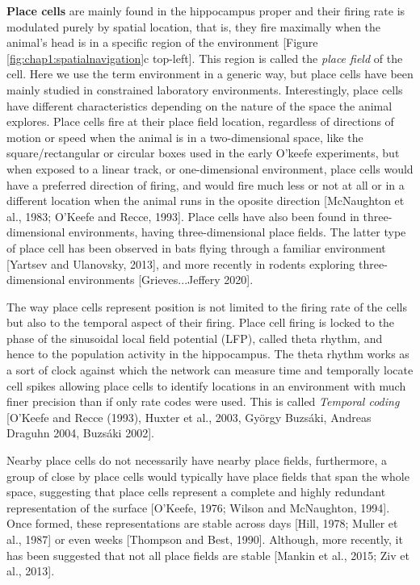 \textbf{Place cells} are mainly found in the hippocampus proper and their firing rate is modulated purely by spatial location, that is, they fire maximally when the animal's head is in a specific region of the environment [Figure \ref{fig:chap1:spatialnavigation}c top-left]. 
This region is called the \textit{place field} of the cell.  
Here we use the term environment in a generic way, but place cells have been mainly studied in constrained laboratory environments.
Interestingly, place cells have different characteristics depending on the nature of the space the animal explores.
Place cells fire at their place field location, regardless of directions of motion or speed when the animal is in a two-dimensional space, like the square/rectangular or circular boxes used in the early O'keefe experiments, but when exposed to a linear track, or one-dimensional environment, place cells would have a preferred direction of firing, and would fire much less or not at all or in a different location when the animal runs in the oposite direction [McNaughton et al., 1983; O’Keefe and Recce, 1993].
Place cells have also been found in three-dimensional environments, having three-dimensional place fields.
The latter type of place cell has been observed in bats flying through a familiar environment [Yartsev and Ulanovsky, 2013], and more recently in rodents exploring three-dimensional environments [Grieves...Jeffery 2020].

The way place cells represent position is not limited to the firing rate of the cells but also to the temporal aspect of their firing. 
Place cell firing is locked to the phase of the sinusoidal local field potential (LFP), called theta rhythm, and hence to the population activity in the hippocampus. 
The theta rhythm works as a sort of clock against which the network can measure time and temporally locate cell spikes allowing place cells to identify locations in an environment with much finer precision than if only rate codes were used.
This is called \textit{Temporal coding} [O’Keefe and Recce (1993), Huxter et al., 2003, György Buzsáki, Andreas Draguhn 2004, Buzsáki 2002].

Nearby place cells do not necessarily have nearby place fields, furthermore, a group of close by place cells would typically have place fields that span the whole space, suggesting that place cells represent a complete and highly redundant representation of the surface [O’Keefe, 1976; Wilson and McNaughton, 1994].
Once formed, these representations are stable across days [Hill, 1978; Muller et al., 1987] or even weeks [Thompson and Best, 1990].
Although, more recently, it has been suggested that not all place fields are stable [Mankin et al., 2015; Ziv et al., 2013]. 

